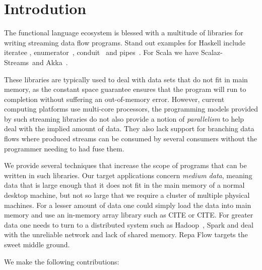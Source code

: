\section{Introdution}

The functional language ecosystem is blessed with a multitude of libraries for writing streaming data flow programs. Stand out examples for Haskell include iteratee \cite{Kiselyov:iteratee}, enumerator~\cite{hackage:enumerator}, conduit~\cite{hackage:conduit} and pipes~\cite{hackage:pipes}. For Scala we have Scalaz-Streams~\CITE and Akka~\CITE.

These libraries are typically used to deal with data sets that do not fit in main memory, as the constant space guarantee ensures that the program will run to completion without suffering an out-of-memory error. However, current computing platforms use multi-core processors, the programming models provided by such streaming libraries do not also provide a notion of \emph{parallelism} to help deal with the implied amount of data. They also lack support for branching data flows where produced streams can be consumed by several consumers without the programmer needing to had fuse them.

We provide several techniques that increase the scope of programs that can be written in such libraries. Our target applications concern \emph{medium data}, meaning data that is large enough that it does not fit in the main memory of a normal desktop machine, but not so large that we require a cluster of multiple physical machines. For a lesser amount of data one could simply load the data into main memory and use an in-memory array library such as CITE or CITE. For greater data one needs to turn to a distributed system such as Hadoop~\cite{Shvachko:Hadoop}, Spark and deal with the unreliable network and lack of shared memory. Repa Flow targets the sweet middle ground.

We make the following contributions:

